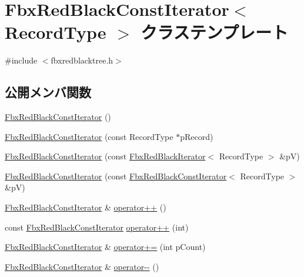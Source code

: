 \hypertarget{class_fbx_red_black_const_iterator}{}\section{Fbx\+Red\+Black\+Const\+Iterator$<$ Record\+Type $>$ クラステンプレート}
\label{class_fbx_red_black_const_iterator}


{\ttfamily \#include $<$fbxredblacktree.\+h$>$}

\subsection*{公開メンバ関数}
\begin{DoxyCompactItemize}
\item 
\hyperlink{class_fbx_red_black_const_iterator_a440804a78f8ea8a535a92187afa5ae77}{Fbx\+Red\+Black\+Const\+Iterator} ()
\item 
\hyperlink{class_fbx_red_black_const_iterator_a175bfbcab9178cd3a5c32430db793d50}{Fbx\+Red\+Black\+Const\+Iterator} (const Record\+Type $\ast$p\+Record)
\item 
\hyperlink{class_fbx_red_black_const_iterator_acfc570820a33364bfb9a234dff126bef}{Fbx\+Red\+Black\+Const\+Iterator} (const \hyperlink{class_fbx_red_black_iterator}{Fbx\+Red\+Black\+Iterator}$<$ Record\+Type $>$ \&pV)
\item 
\hyperlink{class_fbx_red_black_const_iterator_a3f8ba784eb91753a9e25d442e4f32e5f}{Fbx\+Red\+Black\+Const\+Iterator} (const \hyperlink{class_fbx_red_black_const_iterator}{Fbx\+Red\+Black\+Const\+Iterator}$<$ Record\+Type $>$ \&pV)
\item 
\hyperlink{class_fbx_red_black_const_iterator}{Fbx\+Red\+Black\+Const\+Iterator} \& \hyperlink{class_fbx_red_black_const_iterator_a75bbaa3d7e877d62ad4c925251c9a0c4}{operator++} ()
\item 
const \hyperlink{class_fbx_red_black_const_iterator}{Fbx\+Red\+Black\+Const\+Iterator} \hyperlink{class_fbx_red_black_const_iterator_a6f685ed6ec9a5ce0bb540d8895e20a92}{operator++} (int)
\item 
\hyperlink{class_fbx_red_black_const_iterator}{Fbx\+Red\+Black\+Const\+Iterator} \& \hyperlink{class_fbx_red_black_const_iterator_a52467ed33aa95df758d9bfffa13edf2e}{operator+=} (int p\+Count)
\item 
\hyperlink{class_fbx_red_black_const_iterator}{Fbx\+Red\+Black\+Const\+Iterator} \& \hyperlink{class_fbx_red_black_const_iterator_a44635304d3b9cbb8c61a20e9aead2ed4}{operator-\/-\/} ()

\end{DoxyCompactItemize}
